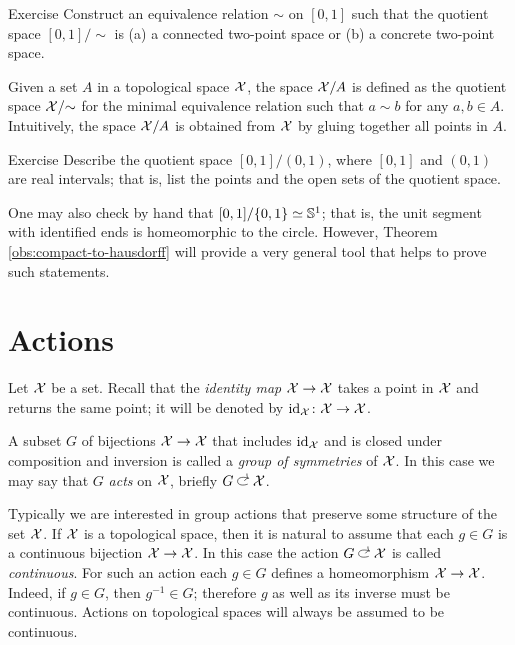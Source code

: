 \begin{thm}{Exercise}\label{ex:example/~}
Construct an equivalence relation $\sim$ on $[0,1]$ such that the quotient space $[0,1]/\sim$ is (a) a connected two-point space or (b) a concrete two-point space.
\end{thm}

Given a set $A$ in a topological space $\mathcal{X}$, the space $\mathcal{X}/A$ is defined as the quotient space $\mathcal{X}/{\sim}$ for the minimal equivalence relation such that $a\sim b$ for any $a,b\in A$.
Intuitively, the space $\mathcal{X}/A$ is obtained from $\mathcal{X}$ by gluing together all points in $A$.

\begin{thm}{Exercise}\label{ex:[0,1]/(0,1)}
Describe the quotient space $[0,1]/(0,1)$, where $[0,1]$ and $(0,1)$ are real intervals;
that is, list the points and the open sets of the quotient space.
\end{thm}

One may also check by hand that $[0,1]/\{0,1\}\z\simeq\SS^1$;
that is, the unit segment with identified ends is homeomorphic to the circle.
However, Theorem \ref{obs:compact-to-hausdorff} will provide a very general tool that helps to prove such statements.

\section{Actions}\label{sec:Actions}

Let $\mathcal{X}$ be a set.
Recall that the \emph{identity map} $\mathcal{X}\to \mathcal{X}$ takes a point in $\mathcal{X}$ and returns the same point;
it will be denoted by \index{$\id$}$\mathrm{id}_{\mathcal{X}}\colon\mathcal{X}\to \mathcal{X}$.

A subset $G$ of bijections $\mathcal{X}\to \mathcal{X}$ that includes $\mathrm{id}_{\mathcal{X}}$ and is closed under composition and inversion is called a \emph{group of symmetries} of $\mathcal{X}$.
In this case we may say that $G$ \emph{acts} on $\mathcal{X}$, briefly $G\acts\c{X}$.

Typically we are interested in group actions that preserve some structure of the set $\mathcal{X}$.
If $\mathcal{X}$ is a topological space, then it is natural to assume that each $g\in G$ is a continuous bijection $\mathcal{X}\to \mathcal{X}$.
In this case the action $G\acts\c{X}$ is called \emph{continuous}.
For such an action each $g\in G$ defines a homeomorphism $\mathcal{X}\to \mathcal{X}$.
Indeed, if $g\in G$, then $g^{-1}\in G$; therefore $g$ as well as its inverse must be continuous.
Actions on topological spaces will always be assumed to be continuous.

